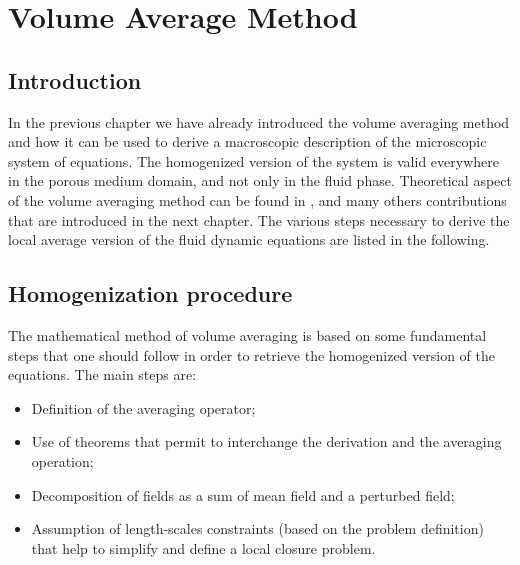 \chapter{Volume Average Method}
\label{ch:vans}


\section{Introduction}

In the previous chapter we have already introduced the volume averaging method and how it can be used to derive a macroscopic description of the microscopic system of equations.
The homogenized version of the system is valid everywhere in the porous medium domain, and not only in the fluid phase.
Theoretical aspect of the volume averaging method can be found in \citet{whitaker2013method} \cite{whitaker1986flow} \cite{whitaker1996forchheimer}, \citet{quintard1994transport1} \cite{quintard1994transport2} \cite{quintard1994transport3} \cite{quintard1994transport4} \cite{quintard1994transport5} and many others contributions that are introduced in the next chapter.
The various steps necessary to derive the local average version of the fluid dynamic equations are listed in the following.

\section{Homogenization procedure}
The mathematical method of volume averaging is based on some fundamental steps that one should follow in order to retrieve the homogenized version of the equations.
The main steps are:
\begin{itemize}
\item Definition of the averaging operator;
\item Use of theorems that permit to interchange the derivation and the averaging operation;
\item Decomposition of fields as a sum of mean field and a perturbed field;
\item Assumption of length-scales constraints (based on the problem definition) that help to simplify and define a local closure  problem.
\end{itemize}

